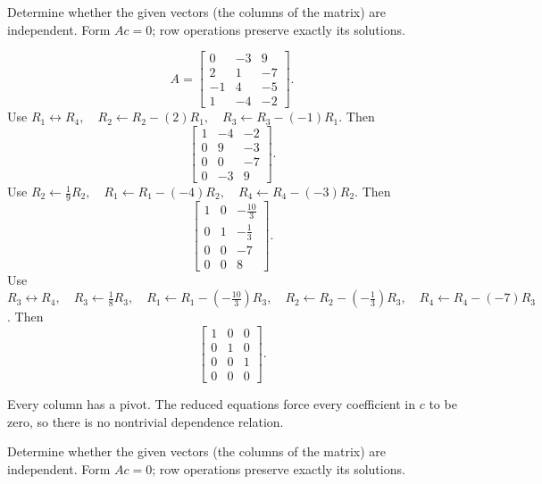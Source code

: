 \goal Determine whether the given vectors (the columns of the matrix) are independent. Form $Ac=0$; row operations preserve exactly its solutions.

\[ A=\begin{bmatrix}0 & -3 & 9\\2 & 1 & -7\\-1 & 4 & -5\\1 & -4 & -2\end{bmatrix}.\]
Use $R_{1}\leftrightarrow R_{4},\quad R_{2}\leftarrow R_{2}-(2)R_{1},\quad R_{3}\leftarrow R_{3}-(-1)R_{1}$. Then
\[ \begin{bmatrix}1 & -4 & -2\\0 & 9 & -3\\0 & 0 & -7\\0 & -3 & 9\end{bmatrix}.\]
Use $R_{2}\leftarrow \frac{1}{9}R_{2},\quad R_{1}\leftarrow R_{1}-(-4)R_{2},\quad R_{4}\leftarrow R_{4}-(-3)R_{2}$. Then
\[ \begin{bmatrix}1 & 0 & - \frac{10}{3}\\0 & 1 & - \frac{1}{3}\\0 & 0 & -7\\0 & 0 & 8\end{bmatrix}.\]
Use $R_{3}\leftrightarrow R_{4},\quad R_{3}\leftarrow \frac{1}{8}R_{3},\quad R_{1}\leftarrow R_{1}-(- \frac{10}{3})R_{3},\quad R_{2}\leftarrow R_{2}-(- \frac{1}{3})R_{3},\quad R_{4}\leftarrow R_{4}-(-7)R_{3}$. Then
\[ \begin{bmatrix}1 & 0 & 0\\0 & 1 & 0\\0 & 0 & 1\\0 & 0 & 0\end{bmatrix}.\]

Every column has a pivot. The reduced equations force every coefficient in $c$ to be zero, so there is no nontrivial dependence relation.



\goal Determine whether the given vectors (the columns of the matrix) are independent. Form $Ac=0$; row operations preserve exactly its solutions.

